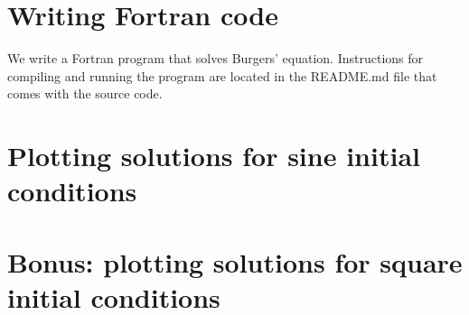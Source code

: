 \section{Writing Fortran code}

We write a Fortran program that solves Burgers' equation. Instructions for compiling and running the program are located in the README.md file that comes with the source code.

\section{Plotting solutions for sine initial conditions}




\section{Bonus: plotting solutions for square initial conditions}





